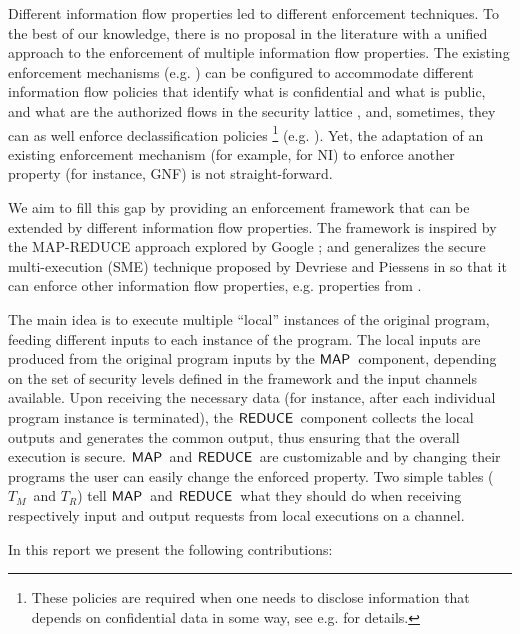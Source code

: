 \documentclass[10pt,a4paper,oneside]{article}
\def\TAV{\ensuremath{T_{M}}}
\def\TPV{\ensuremath{T_{R}}}
\def\sanserif#1{\ensuremath{\sf #1}}
\def\REDUCE{\ensuremath{\sanserif{REDUCE}}}
\def\MAP{\ensuremath{\sanserif{MAP}}}
\begin{document}
Different information flow properties led to different enforcement techniques. To the best of our knowledge, there is no proposal in the literature with a unified approach to the enforcement of multiple information flow properties. The existing enforcement mechanisms (e.g. \cite{Devr-Pies-10-IEEESP,Bart-Arge-Rezk-11-MSCS,Volpano-Irvine-Smith-96-JCS,LeGu-07,Shro-Smit-Thob-2007,Russo-Sabe-09-ESORICS,Capi-Long-Venk-08-ACSAC}) can be configured to accommodate different information flow policies that identify what is confidential and what is public, and what are the authorized flows in the security lattice \cite{Devr-Pies-10-IEEESP,Sabe-Myer-2003}, and, sometimes, they can as well enforce declassification policies
\footnote{These policies are required when one needs to disclose information that depends on confidential data in some way, see e.g. \cite{Myers-Sabelfeld-Zdancewic-04-CSFW,Sabelfeld-Sands-09-JCS} for details.}
(e.g. \cite{Aust-Flan-12-POPL}). Yet, the adaptation of an existing enforcement mechanism (for example, for NI) to enforce another property (for instance, GNF) is not straight-forward.

We aim to fill this gap by providing an enforcement framework that can be extended by different information flow properties.  The framework is inspired by the MAP-REDUCE approach explored by Google \cite{Lamm-07}; and generalizes the secure multi-execution (SME) technique proposed by Devriese and Piessens in \cite{Devr-Pies-10-IEEESP} so that it can enforce other information flow properties, e.g. properties from \cite{MANT-00-CSF}.

The main idea is to execute multiple ``local'' instances of the original program, feeding different inputs to each instance of the program. The local inputs are produced from the original program inputs by the \MAP\ component, depending on the set of security levels defined in the framework and the input channels available. Upon receiving the necessary data (for instance, after each individual program instance is terminated), the \REDUCE\ component collects the local outputs and generates the common output, thus ensuring that the overall execution is secure. \MAP\ and \REDUCE\ are customizable and by changing their programs the user can easily change the enforced property. Two simple tables (\TAV\ and \TPV) tell \MAP\ and \REDUCE\ what they should do when receiving respectively input and output requests from local executions on a channel.




In this report we present the following contributions:
\end{document}
